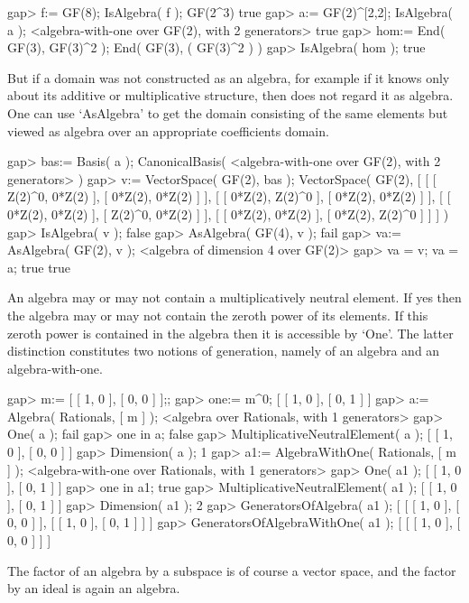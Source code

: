 \beginexample
    gap> f:= GF(8); IsAlgebra( f );
    GF(2^3)
    true
    gap> a:= GF(2)^[2,2]; IsAlgebra( a );
    <algebra-with-one over GF(2), with 2 generators>
    true
    gap> hom:= End( GF(3), GF(3)^2 );
    End( GF(3), ( GF(3)^2 ) )
    gap> IsAlgebra( hom );
    true
\endexample

But if a domain was not constructed as an algebra,
for example if it knows only about its additive or multiplicative
structure, then {\GAP} does not regard it as algebra.
One can use `AsAlgebra' to get the domain consisting of the same elements
but viewed as algebra over an appropriate coefficients domain.

\beginexample
    gap> bas:= Basis( a );
    CanonicalBasis( <algebra-with-one over GF(2), with 2 generators> )
    gap> v:= VectorSpace( GF(2), bas );
    VectorSpace( GF(2), [ [ [ Z(2)^0, 0*Z(2) ], [ 0*Z(2), 0*Z(2) ] ], 
      [ [ 0*Z(2), Z(2)^0 ], [ 0*Z(2), 0*Z(2) ] ], 
      [ [ 0*Z(2), 0*Z(2) ], [ Z(2)^0, 0*Z(2) ] ], 
      [ [ 0*Z(2), 0*Z(2) ], [ 0*Z(2), Z(2)^0 ] ] ] )
    gap> IsAlgebra( v );
    false
    gap> AsAlgebra( GF(4), v );
    fail
    gap> va:= AsAlgebra( GF(2), v );
    <algebra of dimension 4 over GF(2)>
    gap> va = v; va = a;
    true
    true
\endexample

An algebra may or may not contain a multiplicatively neutral element.
If yes then the algebra may or may not contain the zeroth power
of its elements.
If this zeroth power is contained in the algebra then it is accessible
by `One'.
The latter distinction constitutes two notions of generation,
namely of an algebra and an algebra-with-one.

\beginexample
    gap> m:= [ [ 1, 0 ], [ 0, 0 ] ];;
    gap> one:= m^0;
    [ [ 1, 0 ], [ 0, 1 ] ]
    gap> a:= Algebra( Rationals, [ m ] );
    <algebra over Rationals, with 1 generators>
    gap> One( a );
    fail
    gap> one in a;
    false
    gap> MultiplicativeNeutralElement( a );
    [ [ 1, 0 ], [ 0, 0 ] ]
    gap> Dimension( a );
    1
    gap> a1:= AlgebraWithOne( Rationals, [ m ] );
    <algebra-with-one over Rationals, with 1 generators>
    gap> One( a1 );
    [ [ 1, 0 ], [ 0, 1 ] ]
    gap> one in a1;
    true
    gap> MultiplicativeNeutralElement( a1 );
    [ [ 1, 0 ], [ 0, 1 ] ]
    gap> Dimension( a1 );
    2
    gap> GeneratorsOfAlgebra( a1 );
    [ [ [ 1, 0 ], [ 0, 0 ] ], [ [ 1, 0 ], [ 0, 1 ] ] ]
    gap> GeneratorsOfAlgebraWithOne( a1 );
    [ [ [ 1, 0 ], [ 0, 0 ] ] ]
\endexample

The factor of an algebra by a subspace is of course a vector space,
and the factor by an ideal is again an algebra.

